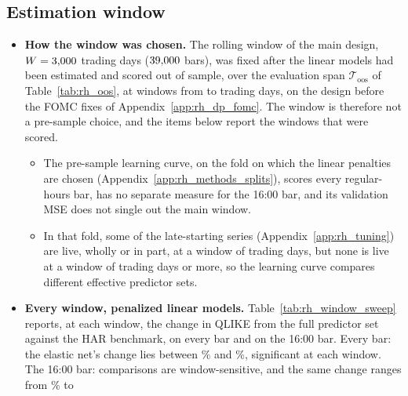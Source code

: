 \subsection{Estimation window}
\label{app:rh_robust_window}
\begin{itemize}
\item \textbf{How the window was chosen.} The rolling window of the main design, $W = 3{,}000$ trading days
  ($39{,}000$ bars), was fixed after the linear models had been estimated and scored out of sample,
  over the evaluation span $\mathcal T_{\mathrm{oos}}$ of Table~\ref{tab:rh_oos}, at \rhwsNWin{} windows from
  \rhwsWinMin{} to \rhwsWinMax{} trading days, on the design before the FOMC fixes of
  Appendix~\ref{app:rh_dp_fomc}. The window is therefore not a pre-sample choice, and the items below report the
  windows that were scored.
  \begin{itemize}
  \item The pre-sample learning curve, on the fold on which the linear penalties are chosen
    (Appendix~\ref{app:rh_methods_splits}), scores every regular-hours bar, has no separate measure for the 16:00
    bar, and its validation MSE does not single out the main window.
  \item In that fold, some of the late-starting series (Appendix~\ref{app:rh_tuning}) are live, wholly or in part,
    at a window of \rhwsWinMin{} trading days, but none is live at a window of \rhwsLateNoneFrom{} trading days or
    more, so the learning curve compares different effective predictor sets.
  \end{itemize}
%
\item \textbf{Every window, penalized linear models.} Table~\ref{tab:rh_window_sweep} reports, at each window, the
  change in QLIKE from the full predictor set against the HAR benchmark, on every bar and on the 16:00 bar. Every bar:
  the elastic net's change lies between \rhwsEnetBarPctMin\% and \rhwsEnetBarPctMax\%, significant at each window.
  The 16:00 bar: comparisons are window-sensitive, and the same change ranges from \rhwsEnetClosePctMin\% to

\end{itemize}
